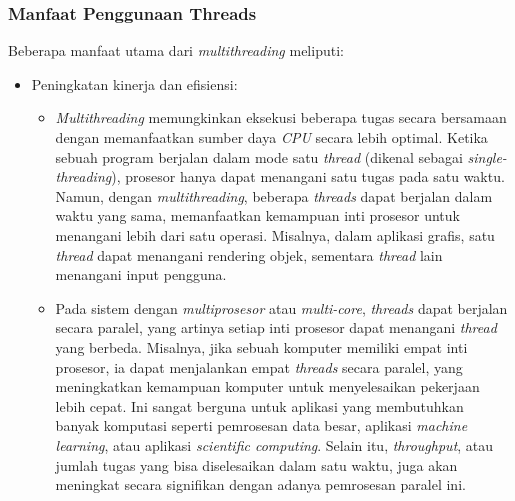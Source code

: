 \documentclass[12pt]{article}
\begin{document}
\subsubsection{Manfaat Penggunaan Threads}
Beberapa manfaat utama dari \textit{multithreading} meliputi:
\begin{itemize}
    \item Peningkatan kinerja dan efisiensi:
    \begin{itemize}
        \item \textit{Multithreading} memungkinkan eksekusi beberapa tugas secara bersamaan dengan memanfaatkan sumber daya \textit{CPU} secara lebih optimal. Ketika sebuah program berjalan dalam mode satu \textit{thread} (dikenal sebagai \textit{single-threading}), prosesor hanya dapat menangani satu tugas pada satu waktu. Namun, dengan \textit{multithreading}, beberapa \textit{threads} dapat berjalan dalam waktu yang sama, memanfaatkan kemampuan inti prosesor untuk menangani lebih dari satu operasi. Misalnya, dalam aplikasi grafis, satu \textit{thread} dapat menangani rendering objek, sementara \textit{thread} lain menangani input pengguna.
        \item Pada sistem dengan \textit{multiprosesor} atau \textit{multi-core}, \textit{threads} dapat berjalan secara paralel, yang artinya setiap inti prosesor dapat menangani \textit{thread} yang berbeda. Misalnya, jika sebuah komputer memiliki empat inti prosesor, ia dapat menjalankan empat \textit{threads} secara paralel, yang meningkatkan kemampuan komputer untuk menyelesaikan pekerjaan lebih cepat. Ini sangat berguna untuk aplikasi yang membutuhkan banyak komputasi seperti pemrosesan data besar, aplikasi \textit{machine learning}, atau aplikasi \textit{scientific computing}. Selain itu, \textit{throughput}, atau jumlah tugas yang bisa diselesaikan dalam satu waktu, juga akan meningkat secara signifikan dengan adanya pemrosesan paralel ini.
    \end{itemize}
    

\end{itemize}
\end{document}

